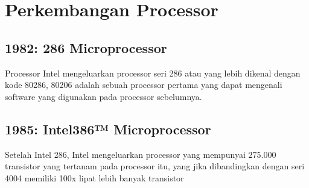 \section{Perkembangan Processor}
\subsection{1982: 286 Microprocessor}
Processor Intel mengeluarkan processor seri 286 atau yang lebih dikenal dengan kode 80286, 80206 adalah sebuah processor pertama yang dapat mengenali software yang digunakan pada processor sebelumnya.

\subsection{1985: Intel386™ Microprocessor}
Setelah Intel 286, Intel mengeluarkan processor yang mempunyai 275.000 transistor yang tertanam pada processor itu, yang jika dibandingkan dengan seri 4004 memiliki 100x lipat lebih banyak transistor
